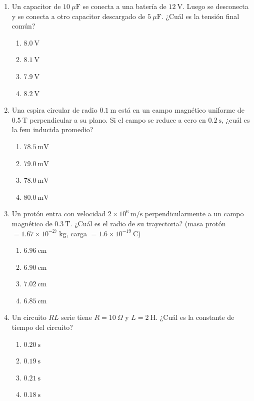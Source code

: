 \documentclass[12pt]{article}
\begin{document}
\begin{enumerate}
\item Un capacitor de $10\ \mu\text{F}$ se conecta a una batería de $12\ \text{V}$. Luego se desconecta y se conecta a otro capacitor descargado de $5\ \mu\text{F}$. ¿Cuál es la tensión final común?
\begin{enumerate}[label=(\alph*)]
\item $8.0\ \text{V}$
\item $8.1\ \text{V}$
\item $7.9\ \text{V}$
\item $8.2\ \text{V}$
\end{enumerate}

\item Una espira circular de radio $0.1\ \text{m}$ está en un campo magnético uniforme de $0.5\ \text{T}$ perpendicular a su plano. Si el campo se reduce a cero en $0.2\ \text{s}$, ¿cuál es la fem inducida promedio?
\begin{enumerate}[label=(\alph*)]
\item $78.5\ \text{mV}$
\item $79.0\ \text{mV}$
\item $78.0\ \text{mV}$
\item $80.0\ \text{mV}$
\end{enumerate}

\item Un protón entra con velocidad $2\times10^6\ \text{m/s}$ perpendicularmente a un campo magnético de $0.3\ \text{T}$. ¿Cuál es el radio de su trayectoria? (masa protón $= 1.67\times10^{-27}\ \text{kg}$, carga $= 1.6\times10^{-19}\ \text{C}$)
\begin{enumerate}[label=(\alph*)]
\item $6.96\ \text{cm}$
\item $6.90\ \text{cm}$
\item $7.02\ \text{cm}$
\item $6.85\ \text{cm}$
\end{enumerate}

\item Un circuito $RL$ serie tiene $R = 10\ \Omega$ y $L = 2\ \text{H}$. ¿Cuál es la constante de tiempo del circuito?
\begin{enumerate}[label=(\alph*)]
\item $0.20\ \text{s}$
\item $0.19\ \text{s}$
\item $0.21\ \text{s}$
\item $0.18\ \text{s}$
\end{enumerate}


\end{enumerate}
\end{document}
